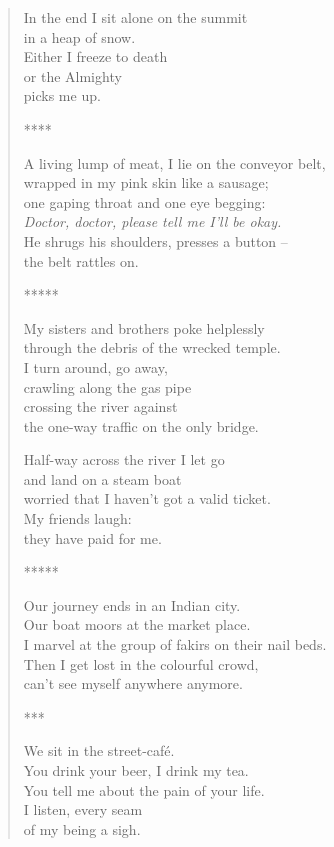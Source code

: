 \begin{verse}
In the end I sit alone on the summit\\
in a heap of snow.\\
Either I freeze to death\\
or the Almighty\\
picks me up.

****

A living lump of meat, I lie on the conveyor belt,\\
wrapped in my pink skin like a sausage;\\
one gaping throat and one eye begging:\\
\emph{Doctor, doctor, please tell me I'll be okay.}\\
He shrugs his shoulders, presses a button --\\
the belt rattles on.

*****

My sisters and brothers poke helplessly\\
through the debris of the wrecked temple.\\
I turn around, go away,\\
crawling along the gas pipe\\
crossing the river against\\
the one-way traffic on the only bridge.

Half-way across the river I let go\\
and land on a steam boat\\
worried that I haven't got a valid ticket.\\
My friends laugh:\\
they have paid for me.

*****

Our journey ends in an Indian city.\\
Our boat moors at the market place.\\
I marvel at the group of fakirs on their nail beds.\\
Then I get lost in the colourful crowd,\\
can't see myself anywhere anymore.

***

We sit in the street-café.\\
You drink your beer, I drink my tea.\\
You tell me about the pain of your life.\\
I listen, every seam\\
of my being a sigh.


\end{verse}
